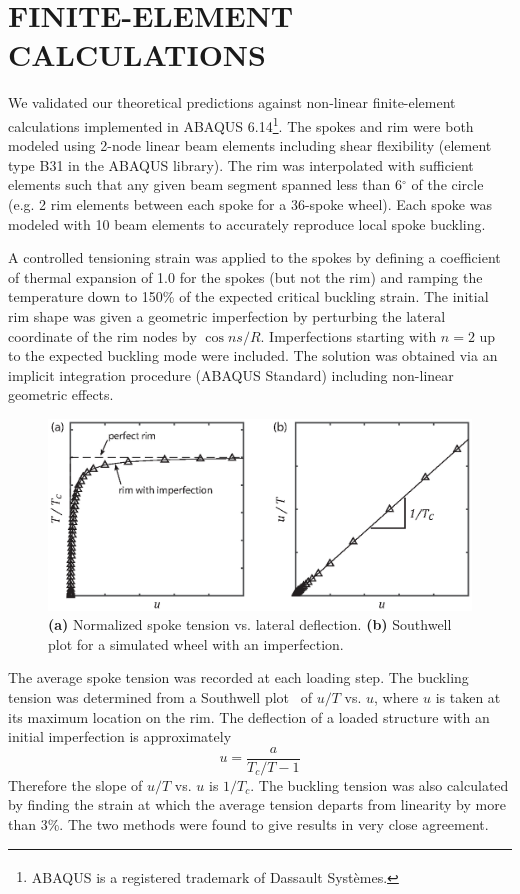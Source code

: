 \documentclass{bmd2016p}
\begin{document}
\section{FINITE-ELEMENT CALCULATIONS}
We validated our theoretical predictions against non-linear finite-element calculations implemented in ABAQUS\textsuperscript{\textregistered} 6.14\footnote{ABAQUS\textsuperscript{\textregistered} is a registered trademark of Dassault Syst\`emes.}. The spokes and rim were both modeled using 2-node linear beam elements including shear flexibility (element type B31 in the ABAQUS library). The rim was interpolated with sufficient elements such that any given beam segment spanned less than 6$^{\circ}$ of the circle (e.g. 2 rim elements between each spoke for a 36-spoke wheel). Each spoke was modeled with 10 beam elements to accurately reproduce local spoke buckling.

A controlled tensioning strain was applied to the spokes by defining a coefficient of thermal expansion of 1.0 for the spokes (but not the rim) and ramping the temperature down to 150\% of the expected critical buckling strain. The initial rim shape was given a geometric imperfection by perturbing the lateral coordinate of the rim nodes by $\cos{ns/R}$. Imperfections starting with $n=2$ up to the expected buckling mode were included. The solution was obtained via an implicit integration procedure (ABAQUS Standard) including non-linear geometric effects.

\begin{figure}[!ht]
\centering
\includegraphics[scale=1.0]{figures/bmd_figures-07.eps}
\caption{\textbf{(a)} Normalized spoke tension vs. lateral deflection. \textbf{(b)} Southwell plot for a simulated wheel with an imperfection.}
\label{fig:Southwell}
\end{figure}

The average spoke tension was recorded at each loading step. The buckling tension was determined from a Southwell plot~\cite{Timoshenko1961a} of $u/T$ vs. $u$, where $u$ is taken at its maximum location on the rim. The deflection of a loaded structure with an initial imperfection is approximately
	\begin{equation}\label{eq:Southwell}
	u = \frac{a}{T_c/T - 1}
	\end{equation}
Therefore the slope of $u/T$ vs. $u$ is $1/T_c$. The buckling tension was also calculated by finding the strain at which the average tension departs from linearity by more than 3\%. The two methods were found to give results in very close agreement.
\end{document}
